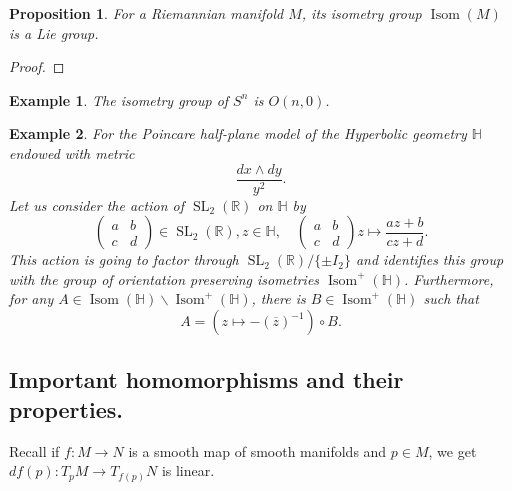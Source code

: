 \documentclass{article}
\newtheorem{proposition}{Proposition}[section]
\newtheorem{example}{Example}[section]
\numberwithin{equation}{section}
\DeclareMathOperator{\Isom}{Isom}
\DeclareMathOperator{\SL}{SL}
\begin{document}
\begin{proposition}
For a Riemannian manifold $M$, its isometry group $\Isom(M)$ is a Lie group.
\end{proposition}

\begin{proof}
\end{proof}

\begin{example}
The isometry group of $S^n$ is $O(n,0)$.
\end{example}

\begin{example}
For the Poincare half-plane model of the Hyperbolic geometry $\mathbb{H}$ endowed with metric
\begin{equation*}
{\frac {dx\wedge dy} {y^2}}.
\end{equation*}
Let us consider the action of $\SL_2(\mathbb{R})$ on $\mathbb{H}$ by 
\begin{equation*}
\begin{pmatrix}a&b\\ c&d\end{pmatrix}\in\SL_2(\mathbb{R}),z\in\mathbb{H},\quad \begin{pmatrix}a&b\\ c&d\end{pmatrix}z\mapsto {\frac {az+b} {cz+d}}.
\end{equation*}
This action is going to factor through $\SL_2(\mathbb{R})/\{\pm I_2\}$ and identifies this group with the group of orientation preserving isometries $\Isom^+(\mathbb{H})$. Furthermore, for any $A\in\Isom(\mathbb{H})\backslash\Isom^+(\mathbb{H})$, there is $B\in\Isom^+(\mathbb{H})$ such that 
\begin{equation*}
A = (z\mapsto -(\overline{z})^{-1})\circ B.
\end{equation*}
\end{example}

\subsection{Important homomorphisms and their properties.}

Recall if $f:M\to N$ is a smooth map of smooth manifolds and $p\in M$, we get $df(p):T_pM\to T_{f(p)}N$ is linear. 
\end{document}
